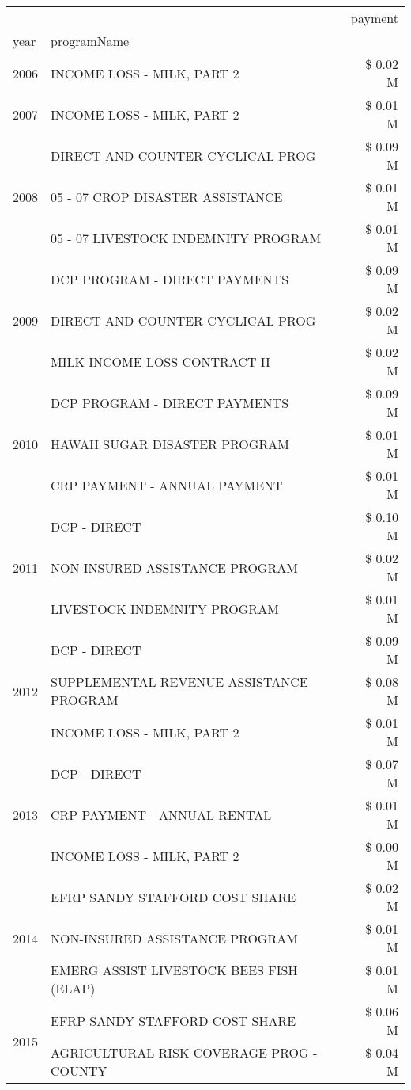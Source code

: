 \begin{tabular}{llr}
\toprule
 &  & payment \\
year & programName &  \\
\midrule
2006 & INCOME LOSS - MILK, PART 2 & \$ 0.02 M \\
\cline{1-3}
2007 & INCOME LOSS - MILK, PART 2 & \$ 0.01 M \\
\cline{1-3}
\multirow[t]{3}{*}{2008} & DIRECT AND COUNTER CYCLICAL PROG & \$ 0.09 M \\
 & 05 - 07 CROP DISASTER ASSISTANCE & \$ 0.01 M \\
 & 05 - 07 LIVESTOCK INDEMNITY PROGRAM & \$ 0.01 M \\
\cline{1-3}
\multirow[t]{3}{*}{2009} & DCP PROGRAM - DIRECT PAYMENTS & \$ 0.09 M \\
 & DIRECT AND COUNTER CYCLICAL PROG & \$ 0.02 M \\
 & MILK INCOME LOSS CONTRACT II & \$ 0.02 M \\
\cline{1-3}
\multirow[t]{3}{*}{2010} & DCP PROGRAM - DIRECT PAYMENTS & \$ 0.09 M \\
 & HAWAII SUGAR DISASTER PROGRAM & \$ 0.01 M \\
 & CRP PAYMENT - ANNUAL PAYMENT & \$ 0.01 M \\
\cline{1-3}
\multirow[t]{3}{*}{2011} & DCP - DIRECT & \$ 0.10 M \\
 & NON-INSURED ASSISTANCE PROGRAM & \$ 0.02 M \\
 & LIVESTOCK INDEMNITY PROGRAM & \$ 0.01 M \\
\cline{1-3}
\multirow[t]{3}{*}{2012} & DCP - DIRECT & \$ 0.09 M \\
 & SUPPLEMENTAL REVENUE ASSISTANCE PROGRAM & \$ 0.08 M \\
 & INCOME LOSS - MILK, PART 2 & \$ 0.01 M \\
\cline{1-3}
\multirow[t]{3}{*}{2013} & DCP - DIRECT & \$ 0.07 M \\
 & CRP PAYMENT - ANNUAL RENTAL & \$ 0.01 M \\
 & INCOME LOSS - MILK, PART 2 & \$ 0.00 M \\
\cline{1-3}
\multirow[t]{3}{*}{2014} & EFRP SANDY STAFFORD COST SHARE & \$ 0.02 M \\
 & NON-INSURED ASSISTANCE PROGRAM & \$ 0.01 M \\
 & EMERG ASSIST LIVESTOCK BEES FISH (ELAP) & \$ 0.01 M \\
\cline{1-3}
\multirow[t]{3}{*}{2015} & EFRP SANDY STAFFORD COST SHARE & \$ 0.06 M \\
 & AGRICULTURAL RISK COVERAGE PROG - COUNTY & \$ 0.04 M \\

\end{tabular}
